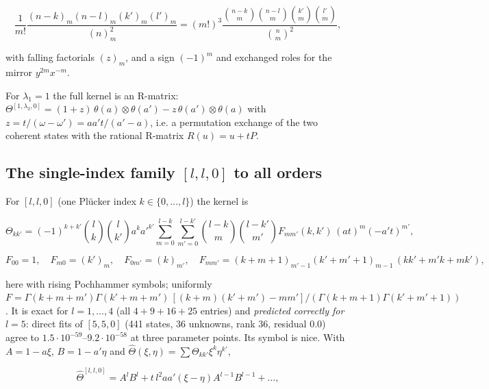 \documentclass[11pt]{article}
\begin{document}
\begin{equation}
\frac1{m!}\frac{(n-k)_m(n-l)_m(k')_m(l')_m}{(n)_m^2}=(m!)^3\frac{\binom{n-k}m\binom{n-l}m\binom{k'}m\binom{l'}m}{\binom nm^2},\label{eq:hops}
\end{equation}

with falling factorials $(z)_m$, and a sign $(-1)^m$ and exchanged roles for the mirror $y^{2m}x^{-m}$.

For $\lambda_1=1$ the full kernel is an R-matrix: $\Theta^{[1,\lambda_2,0]}=(1+z)\,\theta(a)\otimes\theta(a')-z\,\theta(a')\otimes\theta(a)$ with $z=t/(\omega-\omega')=aa't/(a'-a)$, i.e. a permutation exchange of the two coherent states with the rational R-matrix $R(u)=u+tP$.

\subsection{The single-index family \texorpdfstring{$[l,l,0]$}{[l,l,0]} to all orders}\label{sec:single}

For $[l,l,0]$ (one Plücker index $k\in\{0,\dots,l\}$) the kernel is

\begin{equation}
\Theta_{kk'}=(-1)^{k+k'}\binom lk\binom l{k'}a^ka'^{k'}\sum_{m=0}^{l-k}\sum_{m'=0}^{l-k'}\binom{l-k}m\binom{l-k'}{m'}F_{mm'}(k,k')\,(at)^m(-a't)^{m'},\label{eq:single}
\end{equation}

\begin{equation}
F_{00}=1,\quad F_{m0}=(k')_m,\quad F_{0m'}=(k)_{m'},\quad F_{mm'}=(k+m+1)_{m'-1}(k'+m'+1)_{m-1}\,(kk'+m'k+mk'),
\end{equation}

here with rising Pochhammer symbols; uniformly $F=\Gamma(k+m+m')\Gamma(k'+m+m')\,[(k+m)(k'+m')-mm']/(\Gamma(k+m+1)\Gamma(k'+m'+1))$. It is exact for $l=1,\dots,4$ (all $4+9+16+25$ entries) and \emph{predicted correctly for $l=5$}: direct fits of $[5,5,0]$ (441 states, 36 unknowns, rank 36, residual $0.0$) agree to $1.5\cdot10^{-59}$--$9.2\cdot10^{-58}$ at three parameter points.
Its symbol is nice.
With $A=1-a\xi$, $B=1-a'\eta$ and $\hat\Theta(\xi,\eta)=\sum\Theta_{kk'}\xi^k\eta^{k'}$,

\begin{equation}
\hat\Theta^{[l,l,0]}=A^lB^l+t\,l^2aa'(\xi-\eta)A^{l-1}B^{l-1}+\dots,\label{eq:symbol2}
\end{equation}
\end{document}
